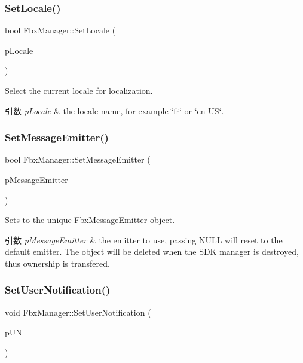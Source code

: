 \subsubsection{\texorpdfstring{Set\+Locale()}{SetLocale()}}
{\footnotesize\ttfamily bool Fbx\+Manager\+::\+Set\+Locale (\begin{DoxyParamCaption}\item[{const char $\ast$}]{p\+Locale }\end{DoxyParamCaption})}

Select the current locale for localization. 
\begin{DoxyParams}{引数}
{\em p\+Locale} & the locale name, for example \char`\"{}fr\char`\"{} or \char`\"{}en-\/\+U\+S\char`\"{}. \\
\hline
\end{DoxyParams}
\mbox{\label{class_fbx_manager_abd21131f9e68869f0f575ea177c337e8}} 
\subsubsection{\texorpdfstring{Set\+Message\+Emitter()}{SetMessageEmitter()}}
{\footnotesize\ttfamily bool Fbx\+Manager\+::\+Set\+Message\+Emitter (\begin{DoxyParamCaption}\item[{Fbx\+Message\+Emitter $\ast$}]{p\+Message\+Emitter }\end{DoxyParamCaption})}

Sets to the unique Fbx\+Message\+Emitter object. 
\begin{DoxyParams}{引数}
{\em p\+Message\+Emitter} & the emitter to use, passing N\+U\+LL will reset to the default emitter. The object will be deleted when the S\+DK manager is destroyed, thus ownership is transfered. \\
\hline
\end{DoxyParams}
\mbox{\label{class_fbx_manager_aa44b61ecaa5294df62a21726ed112c75}} 
\subsubsection{\texorpdfstring{Set\+User\+Notification()}{SetUserNotification()}}
{\footnotesize\ttfamily void Fbx\+Manager\+::\+Set\+User\+Notification (\begin{DoxyParamCaption}\item[{\hyperlink{class_fbx_user_notification}{Fbx\+User\+Notification} $\ast$}]{p\+UN }\end{DoxyParamCaption})}

